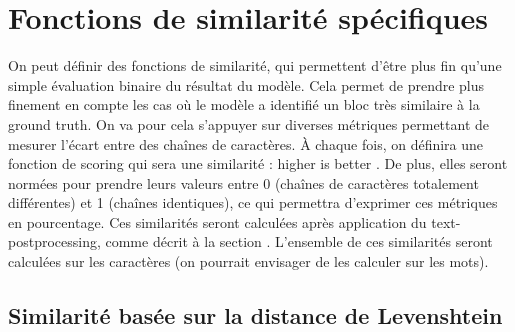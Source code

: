        \section{Fonctions de \og similarité \fg spécifiques}

        On peut définir des fonctions de similarité, qui permettent d'être plus fin qu'une simple évaluation binaire du résultat du modèle.
        Cela permet de prendre plus finement en compte les cas où le modèle a identifié un bloc très similaire à la ground truth.
        On va pour cela s'appuyer sur diverses métriques permettant de mesurer l'écart entre des chaînes de caractères.
        \`{A} chaque fois, on définira une fonction de scoring qui sera une similarité : \og higher is better \fg.
        De plus, elles seront normées pour prendre leurs valeurs entre 0 (chaînes de caractères totalement différentes) et 1 (chaînes identiques), ce qui permettra d'exprimer ces métriques en pourcentage.
        Ces similarités seront calculées après application du text-postprocessing, comme décrit à la section .
        L'ensemble de ces similarités seront calculées sur les caractères (on pourrait envisager de les calculer sur les mots).

            \subsection{Similarité basée sur la distance de Levenshtein}

